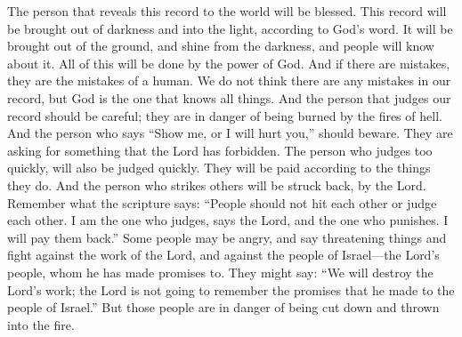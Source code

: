 The person that reveals this record to the world will be blessed. This record will be brought out of darkness and into the light, according to God's word. It will be brought out of the ground, and shine from the darkness, and people will know about it. All of this will be done by the power of God.
\bverse \iffalse And if there be faults they be the faults of a man. But behold, we know no fault; nevertheless God knoweth all things; therefore, he that condemneth, let him be aware lest he shall be in danger of hell fire. \fi
And if there are mistakes, they are the mistakes of a human. We do not think there are any mistakes in our record, but God is the one that knows all things. And the person that judges our record should be careful; they are in danger of being burned by the fires of hell.
\bverse \iffalse And he that saith: Show unto me, or ye shall be smitten--let him beware lest he commandeth that which is forbidden of the Lord. \fi
And the person who says ``Show me, or I will hurt you,'' should beware. They are asking for something that the Lord has forbidden.
\bverse \iffalse For behold, the same that judgeth rashly shall be judged rashly again; for according to his works shall his wages be; therefore, he that smiteth shall be smitten again, of the Lord. \fi
The person who judges too quickly, will also be judged quickly. They will be paid according to the things they do. And the person who strikes others will be struck back, by the Lord.
\bverse \iffalse Behold what the scripture says--man shall not smite, neither shall he judge; for judgment is mine, saith the Lord, and vengeance is mine also, and I will repay. \fi
Remember what the scripture says: ``People should not hit each other or judge each other. I am the one who judges, says the Lord, and the one who punishes. I will pay them back.''
\bverse \iffalse And he that shall breathe out wrath and strifes against the work of the Lord, and against the covenant people of the Lord who are the house of Israel, and shall say: We will destroy the work of the Lord, and the Lord will not remember his covenant which he hath made unto the house of Israel--the same is in danger to be hewn down and cast into the fire; \fi
Some people may be angry, and say threatening things and fight against the work of the Lord, and against the people of Israel---the Lord's people, whom he has made promises to. They might say: ``We will destroy the Lord's work; the Lord is not going to remember the promises that he made to the people of Israel.'' But those people are in danger of being cut down and thrown into the fire.
